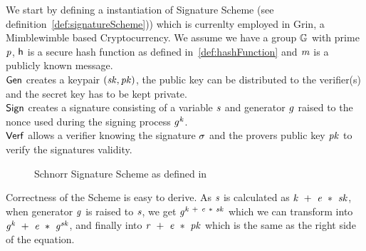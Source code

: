 We start by defining a instantiation of Signature Scheme (see definition~\ref{def:signatureScheme})) which is currenlty employed in Grin, a Mimblewimble based Cryptocurrency.
We assume we have a group $\mathbb{G}$ with prime $\mathit{p}$, $\mathsf{h}$ is a secure hash function as defined in~\ref{def:hashFunction} and $\mathit{m}$ is a publicly known message.\\
$\mathsf{\mathsf{Gen}}$ creates a keypair $(\mathit{sk}, \mathit{pk})$, the public key can be distributed to the verifier(s) and the secret key has to be kept private. \\
$\mathsf{Sign}$ creates a signature consisting of a variable $\mathit{s}$ and generator $\mathit{g}$ raised to the nonce used during the signing process $\mathit{g}^{\mathit{k}}$. \\
$\mathsf{Verf}$ allows a verifier knowing the signature $\sigma$ and the provers public key $\mathit{pk}$ to verify the signatures validity. \\
\begin{figure}
    \label{fig:schnorr}
    \fbox{
        \parbox{\textwidth}{
            \procedure[linenumbering, syntaxhighlight=auto]{$\procGen{\varSecParam}$} {
                \varKey \sample \cnstIntegersPrimeWithoutZero{\varPrime} \\
                \pcreturn (\varSecKey \opAssign \varKey \opSeperate \varPubKey \opAssign \funGen{\varKey})
            }
            \procedure[linenumbering, syntaxhighlight=auto]{$\procSign{\varMsg}{\varSecKey}$}{
                \varNonce \sample \cnstIntegersPrimeWithoutZero{\varPrime} \\
                \varRand \opAssign \funGen{\varNonce} \\
                \varSchnorrChallenge \opAssign \funHash{\varMsg \opConc \varRand \opConc \varPubKey} \\
                \varS \opAssign \varNonce \opAdd \varSchnorrChallenge \opMult \varSecKey \\
                \pcreturn \varSignature \opAssign (\varS, \varRand)
            }
            \procedure[linenumbering, syntaxhighlight=auto]{$\procVerf{\varMsg}{\varSignature}{\varPubKey}$} {
                \varS \opAssign \opAccess{\varSignature}{\varS} \\
                \varRand \opAssign \opAccess{\varSignature}{\varRand} \\
                \varSchnorrChallenge \opAssign \funHash{\varMsg \opConc \varRand \opConc \varPubKey} \\
                \pcreturn \funGen{\varS} \opEq \varRand \opAdd \varSchnorrChallenge \opMult \varPubKey
            }
        }
    }
    \caption{Schnorr Signature Scheme as defined in~\cite{schnorr1989efficient}}
\end{figure}
Correctness of the Scheme is easy to derive. As $\mathit{s}$ is calculated as $\mathit{k} ~+~ \mathit{e} ~*~ \mathit{sk}$, when generator $\mathit{g}$ is raised to $\mathit{s}$, we get
$\mathit{g}^{\mathit{k} ~+~ \mathit{e} ~*~ \mathit{sk}}$ which we can transform into $\mathit{g}^{\mathit{k}} ~+~ \mathit{e} ~*~ \mathit{g}^{\mathit{sk}}$, and finally
into $\mathit{r} ~+~ \mathit{e} ~*~ \mathit{pk}$ which is the same as the right side of the equation.

